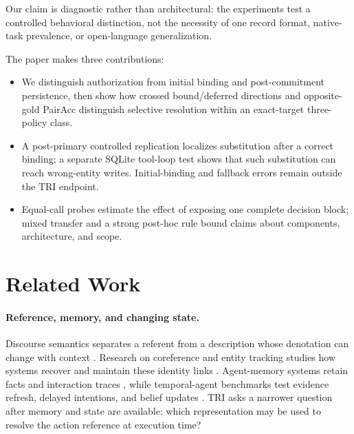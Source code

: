 \documentclass[letterpaper]{article}
\begin{document}
Our claim is diagnostic rather than architectural: the experiments test a controlled behavioral
distinction, not the necessity of one record format, native-task prevalence, or open-language
generalization.

The paper makes three contributions:
\nopagebreak[4]
\begin{itemize}
    \item We distinguish authorization from initial binding and post-commitment persistence, then
    show how crossed bound/deferred directions and opposite-gold PairAcc distinguish selective
    resolution within an exact-target three-policy class.
    \item A post-primary controlled replication localizes substitution after a correct binding; a
    separate SQLite tool-loop test shows that such substitution can reach wrong-entity writes.
    Initial-binding and fallback errors remain outside the TRI endpoint.
    \item Equal-call probes estimate the effect of exposing one complete decision block; mixed
    transfer and a strong post-hoc rule bound claims about components, architecture, and scope.
\end{itemize}

\section{Related Work}

\paragraph{Reference, memory, and changing state.}
Discourse semantics separates a referent from a description whose denotation can change with
context \cite{kamp1993discourse,grosz1995centering}. Research on coreference and entity tracking studies
how systems recover and maintain these identity links
\cite{lee2017coreference,joshi2020spanbert,tang2026entitytracking}. Agent-memory systems retain facts
and interaction traces \cite{packer2023memgpt,sumers2024coala}, while temporal-agent benchmarks test
evidence refresh, delayed intentions, and belief updates
\cite{cheng2026temporalblindness,liu2026pmbench,ji2026clawarena,xu2026evoarena}. TRI asks a narrower
question after memory and state are available: which representation may be used to resolve the
action reference at execution time?
\end{document}
